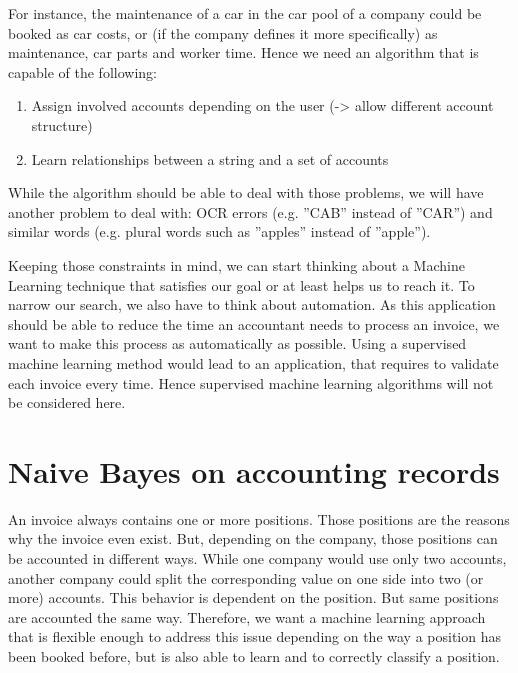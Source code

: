 For instance, the maintenance of a car in the car pool of a company could be booked as car costs, or (if the company defines it more specifically) as maintenance, car parts and worker time.
Hence we need an algorithm that is capable of the following:
\begin{enumerate}
		\item Assign involved accounts depending on the user (-> allow different account structure)
		\item Learn relationships between a string and a set of accounts
\end{enumerate}
While the algorithm should be able to deal with those problems, we will have another problem to deal with: OCR errors (e.g. ''CAB'' instead of ''CAR'')  and similar words (e.g. plural words such as ''apples'' instead of ''apple''). 

Keeping those constraints in mind, we can start thinking about a Machine Learning technique that satisfies our goal or at least helps us to reach it.
To narrow our search, we also have to think about automation. As this application should be able to reduce the time an accountant needs to process an invoice, we want to make this process as automatically as possible. Using a supervised machine learning method would lead to an application, that requires to validate each invoice every time. Hence supervised machine learning algorithms will not be considered here.

\section{Naive Bayes on accounting records}
\label{sec4.1}

An invoice always contains one or more positions. Those positions are the reasons why the invoice even exist. But, depending on the company, those positions can be accounted in different ways. While one company would use only two accounts, another company could split the corresponding value on one side into two (or more) accounts.
This behavior is dependent on the position. But same positions are accounted the same way. Therefore, we want a machine learning approach that is flexible enough to address this issue depending on the way a position has been booked before, but is also able to learn and to correctly classify a position.
